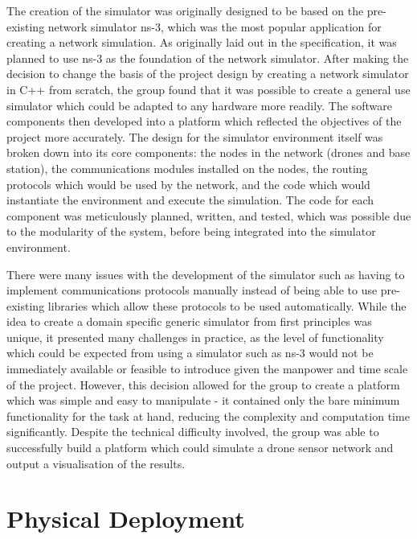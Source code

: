 The creation of the simulator was originally designed to be based on the pre-existing network simulator ns-3, which was the most popular application for creating a network simulation. As originally laid out in the specification, it was planned to use ns-3 as the foundation of the network simulator. After making the decision to change the basis of the project design by creating a network simulator in C++ from scratch, the group found that it was possible to create a general use simulator which could be adapted to any hardware more readily. The software components then developed into a platform which reflected the objectives of the project more accurately. The design for the simulator environment itself was broken down into its core components: the nodes in the network (drones and base station), the communications modules installed on the nodes, the routing protocols which would be used by the network, and the code which would instantiate the environment and execute the simulation. The code for each component was meticulously planned, written, and tested, which was possible due to the modularity of the system, before being integrated into the simulator environment. 

There were many issues with the development of the simulator such as having to implement communications protocols manually instead of being able to use pre-existing libraries which allow these protocols to be used automatically. While the idea to create a domain specific generic simulator from first principles was unique, it presented many challenges in practice, as the level of functionality which could be expected from using a simulator such as ns-3 would not be immediately available or feasible to introduce given the manpower and time scale of the project. However, this decision allowed for the group to create a platform which was simple and easy to manipulate - it contained only the bare minimum functionality for the task at hand, reducing the complexity and computation time significantly. Despite the technical difficulty involved, the group was able to successfully build a platform which could simulate a drone sensor network and output a visualisation of the results.

\section{Physical Deployment}

